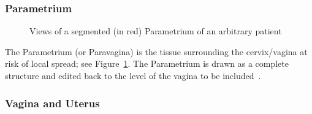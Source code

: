 \documentclass[12pt,twoside]{report}
\begin{document}
\subsubsection{Parametrium}\label{sec:data-Parametrium}

\begin{figure}[H]
  \caption{Views of a segmented (in red) Parametrium of an arbitrary patient}\label{fig:example-Parametrium}
\end{figure}

The Parametrium (or Paravagina) is the tissue surrounding the cervix/vagina at risk of local spread; see Figure~\ref{fig:example-Parametrium}. The Parametrium is drawn as a complete structure and edited back to the level of the vagina to be included~\cite{AMLART-data}.

\subsubsection{Vagina and Uterus}
\end{document}
